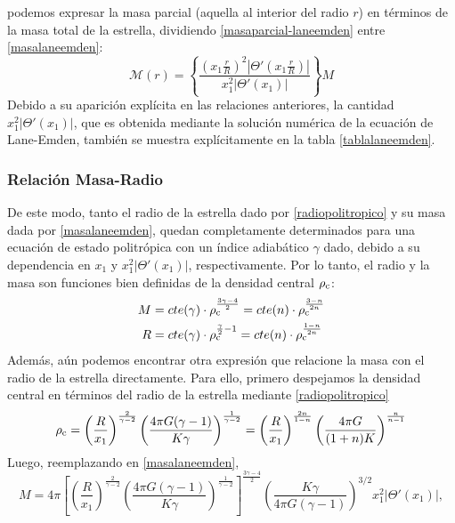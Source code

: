 podemos expresar la masa parcial (aquella al interior del radio $r$) en términos de la masa total de la estrella, dividiendo \eqref{masaparcial-laneemden} entre \eqref{masalaneemden}:
\begin{equation}\label{masapoli-en-r}
\mathcal{M}(r)=\left\{\frac{\left(x_1\frac{r}{R}\right)^2\left|\Theta'\left(x_1\frac{r}{R}\right)\right|}{x_1^2\left|\Theta'(x_1)\right|}\right\}M
\end{equation}
Debido a su aparición explícita en las relaciones anteriores, la cantidad $x_1^2\left|\Theta'(x_1)\right|$, que es obtenida mediante la solución numérica de la ecuación de Lane-Emden, también se muestra explícitamente en la tabla \ref{tablalaneemden}.

\subsubsection{Relación Masa-Radio}
De este modo, tanto el radio de la  estrella dado por \eqref{radiopolitropico} y su masa dada por \eqref{masalaneemden}, quedan completamente determinados para una ecuación de estado politrópica con un índice adiabático $\gamma$ dado, debido a su dependencia en $x_1$ y $x_1^2\left|\Theta'(x_1)\right|$, respectivamente. Por lo tanto, el radio y la masa son funciones bien definidas de la densidad central $\rho_{\rm c}$:
\begin{align}
M&=cte(\gamma)\cdot\rho_{\rm c}^{\frac{3\gamma-4}{2}}=cte(n)\cdot\rho_{\rm c}^{\frac{3-n}{2n}}\label{lane-masagamma}\\
R&=cte(\gamma)\cdot\rho_{\rm c}^{\frac{\gamma}{2}-1}=cte(n)\cdot\rho_{\rm c}^{\frac{1-n}{2n}}\label{lane-radiogamma}
\end{align}
Además, aún podemos encontrar otra expresión que relacione la masa con el radio de la estrella directamente. Para ello, primero despejamos la densidad central en términos del radio de la estrella mediante \eqref{radiopolitropico}
\begin{equation}
 \rho_{\rm c}=\left(\frac{R}{x_1}\right)^{\frac{2}{\gamma-2}}\left(\frac{4\pi G(\gamma-1)}{K\gamma}\right)^{\frac{1}{\gamma-2}}=\left(\frac{R}{x_1}\right)^{\frac{2n}{1-n}}\left(\frac{4\pi G}{(1+n)K}\right)^{\frac{n}{n-1}}
\end{equation}
Luego, reemplazando en \eqref{masalaneemden},
\begin{equation}
 M=4\pi\left[\left(\frac{R}{x_1}\right)^{\frac{2}{\gamma-2}}\left(\frac{4\pi G(\gamma-1)}{K\gamma}\right)^{\frac{1}{\gamma-2}}\right]^{\frac{3\gamma-4}{2}}\left(\frac{K\gamma}{4\pi G(\gamma-1)}\right)^{3/2}x_1^2\left|\Theta'(x_1)\right|,
\end{equation}
